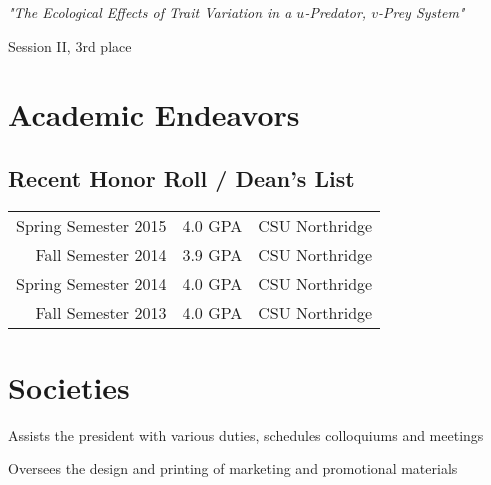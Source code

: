 \documentclass[letterpaper]{deedy-resume} %
\begin{document}
\begin{minipage}[t]{0.66\textwidth}

{\it "The Ecological Effects of Trait Variation in a $u$-Predator, $v$-Prey System"}
\begin{tightitemize}
\item Session II, 3rd place
\end{tightitemize}
\sectionspace






\section{Academic Endeavors}
\subsection{Recent Honor Roll / Dean's List} 

\begin{tabular}{rll}
Spring Semester 2015 & 4.0 GPA & CSU Northridge\\
Fall Semester 2014 & 3.9 GPA & CSU Northridge\\
Spring Semester 2014 & 4.0 GPA & CSU Northridge\\
Fall Semester 2013 & 4.0 GPA & CSU Northridge\\
\end{tabular}

\sectionspace %


\section{Societies}
\begin{tightitemize}
\item Assists the president with various duties, schedules colloquiums and meetings
\item Oversees the design and printing of marketing and promotional materials
\end{tightitemize}


\end{minipage}
\end{document}
